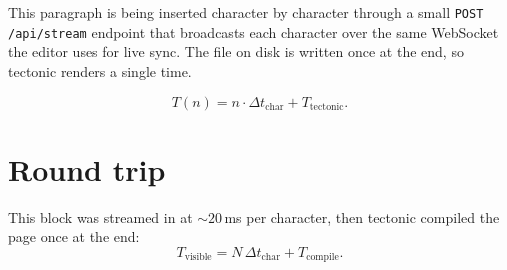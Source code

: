 \documentclass[11pt]{article}
\begin{document}
This paragraph is being inserted character by character through a small
\texttt{POST /api/stream} endpoint that broadcasts each character over
the same WebSocket the editor uses for live sync. The file on disk is
written once at the end, so tectonic renders a single time.

\[
  T(n) = n \cdot \Delta t_{\text{char}} + T_{\text{tectonic}}.
\]



\section*{Round trip}

This block was streamed in at $\sim 20$\,ms per character, then tectonic compiled the page once at the end:
\[
  T_{\text{visible}} = N \,\Delta t_{\text{char}} + T_{\text{compile}}.
\]
\end{document}
